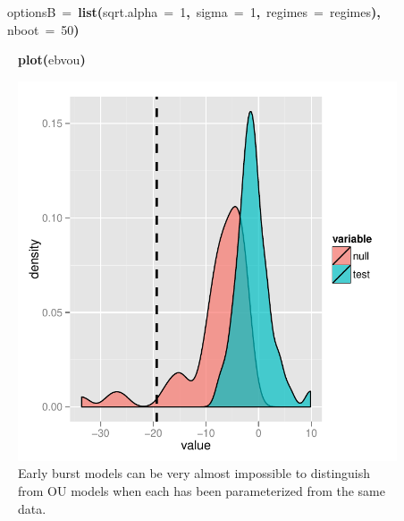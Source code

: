 \documentclass{elsarticle}
\makeatletter
\newcommand{\hlnumber}[1]{\textcolor[rgb]{0,0,0}{#1}}%
\newcommand{\hlfunctioncall}[1]{\textcolor[rgb]{.5,0,.33}{\textbf{#1}}}%
\newcommand{\hlkeyword}[1]{\textbf{#1}}%
\newcommand{\hlargument}[1]{\textcolor[rgb]{.69,.25,.02}{#1}}%
\newcommand{\hlsymbol}[1]{#1}%
\newcommand{\hlstd}[1]{\textcolor[rgb]{0,0,0}{#1}}%
\newenvironment{kframe}{%
 \def\FrameCommand##1{\hskip\@totalleftmargin \hskip-\fboxsep
 \colorbox{shadecolor}{##1}\hskip-\fboxsep
     \hskip-\linewidth \hskip-\@totalleftmargin \hskip\columnwidth}%
 \MakeFramed {\advance\hsize-\width
   \@totalleftmargin\z@ \linewidth\hsize
   \@setminipage}}%
 {\par\unskip\endMakeFramed}
\newenvironment{knitrout}{}{} %
\makeatother
\begin{document}
\begin{knitrout}
\begin{kframe}
\begin{flushleft}
\hlstd{}{\ }{\ }{\ }{\ }\hlargument{optionsB}{\ }\hlargument{=}{\ }\hlfunctioncall{list}\hlkeyword{(}\hlargument{sqrt.alpha}{\ }\hlargument{=}{\ }\hlnumber{1}\hlkeyword{,}{\ }\hlargument{sigma}{\ }\hlargument{=}{\ }\hlnumber{1}\hlkeyword{,}{\ }\hlargument{regimes}{\ }\hlargument{=}{\ }\hlsymbol{regimes}\hlkeyword{)}\hlkeyword{,}\hspace*{\fill}\\
\hlstd{}{\ }{\ }{\ }{\ }\hlargument{nboot}{\ }\hlargument{=}{\ }\hlnumber{50}\hlkeyword{)}\mbox{}
\normalfont
\end{flushleft}
\end{kframe}
\end{knitrout}



\begin{figure}
\begin{knitrout}
\color{fgcolor}\begin{kframe}
\begin{flushleft}
\ttfamily\noindent
\hlfunctioncall{plot}\hlkeyword{(}\hlsymbol{eb\usebox{\hlnormalsizeboxunderscore}v\usebox{\hlnormalsizeboxunderscore}ou}\hlkeyword{)}\mbox{}
\normalfont
\end{flushleft}


{\centering \includegraphics{earlyburst_fig} 

}

\end{kframe}
\end{knitrout}

\caption{Early burst models can be very almost impossible to distinguish from OU models when each has been parameterized from the same data.}\label{fig:eb}
\end{figure}
\end{document}
